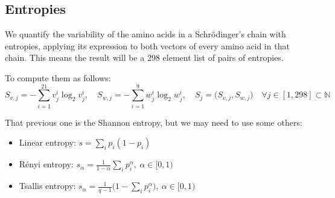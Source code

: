 \subsection{Entropies}

We quantify the variability of the amino acids in a Schrödinger's chain with entropies, applying its expression to both vectors of every amino acid in that chain. This means the result will be a 298 element list of pairs of entropies.

To compute them as follows:
$$
S_{v,j}=-\sum_{i=1}^{21}v^i_j\log_2 v^i_j,\quad S_{w,j}=-\sum_{i=1}^{9} w^i_j\log_2w^i_j,\quad S_j=\big(S_{v,j},S_{w,j}\big)\quad \forall j\in[1,298]\subset\mathbb N
$$

That previous one is the Shannon entropy, but we may need to use some others:
\begin{itemize}
    \item Linear entropy: $s=\sum_ip_i(1-p_i)$
    \item Rényi entropy: $s_\alpha=\frac{1}{1-\alpha}\sum_ip_i^\alpha,\  \alpha\in[0,1)$
    \item Tsallis entropy: $s_\alpha=\frac{1}{q-1}\big(1-\sum_{i}^{} p_i^\alpha \big),\  \alpha\in[0,1)$
\end{itemize}